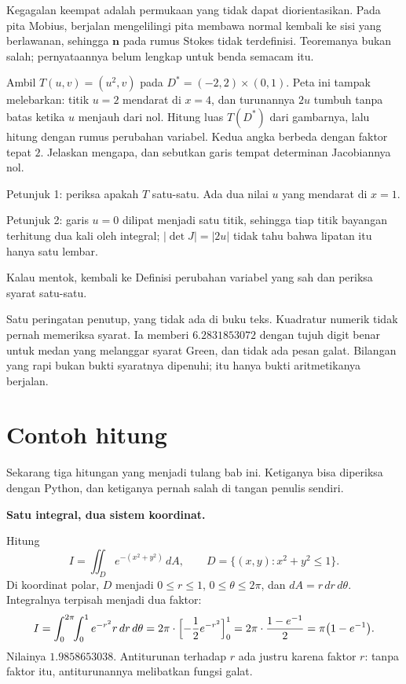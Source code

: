 Kegagalan keempat adalah permukaan yang tidak dapat diorientasikan. Pada pita
Mobius, berjalan mengelilingi pita membawa normal kembali ke sisi yang
berlawanan, sehingga $\mathbf{n}$ pada rumus Stokes tidak terdefinisi.
Teoremanya bukan salah; pernyataannya belum lengkap untuk benda semacam itu.

\begin{tantangan}
Ambil $T(u,v)=(u^{2},v)$ pada $D^{*}=(-2,2)\times(0,1)$. Peta ini tampak
melebarkan: titik $u=2$ mendarat di $x=4$, dan turunannya $2u$ tumbuh tanpa
batas ketika $u$ menjauh dari nol. Hitung luas $T(D^{*})$ dari gambarnya, lalu
hitung dengan rumus perubahan variabel. Kedua angka berbeda dengan faktor tepat
$2$. Jelaskan mengapa, dan sebutkan garis tempat determinan Jacobiannya nol.

Petunjuk 1: periksa apakah $T$ satu-satu. Ada dua nilai $u$ yang mendarat di
$x=1$.

Petunjuk 2: garis $u=0$ dilipat menjadi satu titik, sehingga tiap titik bayangan
terhitung dua kali oleh integral; $|\det J|=|2u|$ tidak tahu bahwa lipatan itu
hanya satu lembar.

Kalau mentok, kembali ke Definisi perubahan variabel yang sah dan periksa syarat
satu-satu.
\end{tantangan}

Satu peringatan penutup, yang tidak ada di buku teks. Kuadratur numerik tidak
pernah memeriksa syarat. Ia memberi $6.2831853072$ dengan tujuh digit benar
untuk medan yang melanggar syarat Green, dan tidak ada pesan galat. Bilangan yang rapi bukan bukti syaratnya dipenuhi; itu hanya bukti
aritmetikanya berjalan.

\section{Contoh hitung}

Sekarang tiga hitungan yang menjadi tulang bab ini. Ketiganya bisa diperiksa
dengan Python, dan ketiganya pernah salah di tangan penulis sendiri.

\textbf{Satu integral, dua sistem koordinat.}
\nopagebreak[4]

Hitung
\[
I=\iint_{D}e^{-(x^{2}+y^{2})}\,dA,\qquad D=\{(x,y):x^{2}+y^{2}\le1\}.
\]
Di koordinat polar, $D$ menjadi $0\le r\le1$, $0\le\theta\le2\pi$, dan
$dA=r\,dr\,d\theta$. Integralnya terpisah menjadi dua faktor:
\[
I=\int_{0}^{2\pi}\!\!\int_{0}^{1}e^{-r^{2}}r\,dr\,d\theta
=2\pi\cdot\Bigl[-\frac12e^{-r^{2}}\Bigr]_{0}^{1}
=2\pi\cdot\frac{1-e^{-1}}{2}=\pi\bigl(1-e^{-1}\bigr).
\]
Nilainya $1.9858653038$. Antiturunan terhadap $r$ ada justru karena faktor
$r$: tanpa faktor itu, antiturunannya melibatkan fungsi galat.

